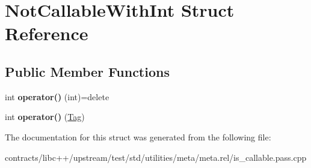 \hypertarget{struct_not_callable_with_int}{}\section{Not\+Callable\+With\+Int Struct Reference}
\label{struct_not_callable_with_int}
\subsection*{Public Member Functions}
\begin{DoxyCompactItemize}
\item 
\mbox{\label{struct_not_callable_with_int_a38fc150455c085be6aec970d942a3a96}} 
int {\bfseries operator()} (int)=delete
\item 
\mbox{\label{struct_not_callable_with_int_ab75c451b5d521c8300de0cef6867f53b}} 
int {\bfseries operator()} (\mbox{\hyperlink{struct_tag}{Tag}})
\end{DoxyCompactItemize}


The documentation for this struct was generated from the following file\+:\begin{DoxyCompactItemize}
\item 
contracts/libc++/upstream/test/std/utilities/meta/meta.\+rel/is\+\_\+callable.\+pass.\+cpp\end{DoxyCompactItemize}
